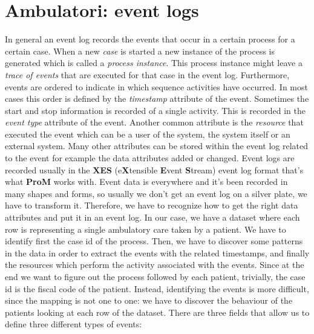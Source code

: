\documentclass[paper=a4, fontsize=11pt]{scrartcl} %
\numberwithin{equation}{section} %
\numberwithin{figure}{section} %
\numberwithin{table}{section} %
\begin{document}
\section{Ambulatori: event logs}
In general an event log records the events that occur in a certain process for a certain case. When a new \textit{case} is started a new instance of the process is generated which is called a \textit{process instance}. This process instance might leave a \textit{trace of events} that are executed for that case in the event log. Furthermore, events are ordered to indicate in which sequence activities have occurred. In most cases this order is defined by the \textit{timestamp} attribute of the event. Sometimes the start and stop information is recorded of a single activity. This is recorded in the \textit{event type} attribute of the event. Another common attribute is the \textit{resource} that executed the event which can be a user of the system, the system itself or an external system. Many other attributes can be stored within the event log related to the event for example the data attributes added or changed. Event logs are recorded usually in the \textbf{XES} (e\textbf{X}tensible \textbf{E}vent \textbf{S}tream) event log format that's what \textbf{ProM} works with. Event data is everywhere and it's been recorded in many shapes and forms, so usually we don't get an event log on a silver plate, we have to transform it. Therefore, we have to recognize how to get the right data attributes and put it in an event log. In our case, we have a dataset where each row is representing a single ambulatory care taken by a patient. We have to identify first the case id of the process. Then, we have to discover some patterns in the data in order to extract the events with the related timestamps, and finally the resources which perform the activity associated with the events. Since at the end we want to figure out the process followed by each patient, trivially, the case id is the fiscal code of the patient. Instead, identifying the events is more difficult, since the mapping is not one to one: we have to discover the behaviour of the patients looking at each row of the dataset. There are three fields that allow us to define three different types of events:
\end{document}
